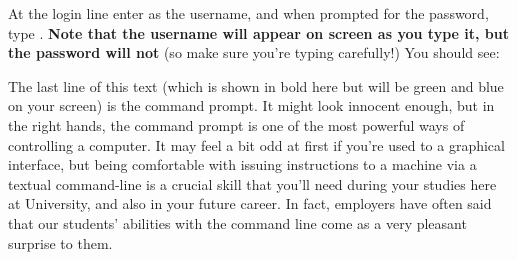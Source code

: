 At the login line enter  as the username, and when prompted for the password, type . \textbf{Note that the username will appear on screen as you type it, but the password will not} (so make sure you're typing carefully!) You should see:



%

The last line of this text (which is shown in bold here but will be green and blue on your screen) is the command prompt. It might look innocent enough, but in the right hands, the command prompt is one of the most powerful ways of controlling a computer. It may feel a bit odd at first if you're used to a graphical interface, but being comfortable with issuing instructions to a machine via a textual command-line is a crucial skill that you'll need during your studies here at University, and also in your future career. In fact, employers have often said that our students' abilities with the command line come as a very pleasant surprise to them.


